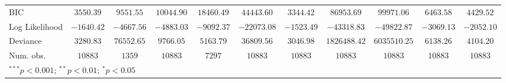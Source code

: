 \begin{tabular}{l c c c c c c c c c c}
BIC              & $3550.39$     & $9551.55$     & $10044.90$    & $18460.49$    & $44443.60$    & $3344.42$      & $86953.69$    & $99971.06$     & $6463.58$      & $4429.52$     \\
Log Likelihood   & $-1640.42$    & $-4667.56$    & $-4883.03$    & $-9092.37$    & $-22073.08$   & $-1523.49$     & $-43318.83$   & $-49822.87$    & $-3069.13$     & $-2052.10$    \\
Deviance         & $3280.83$     & $76552.65$    & $9766.05$     & $5163.79$     & $36809.56$    & $3046.98$      & $1826488.42$  & $6035510.25$   & $6138.26$      & $4104.20$     \\
Num. obs.        & $10883$       & $1359$        & $10883$       & $7297$        & $10883$       & $10883$        & $10883$       & $10883$        & $10883$        & $10883$       \\
\bottomrule
\multicolumn{11}{l}{\scriptsize{$^{***}p<0.001$; $^{**}p<0.01$; $^{*}p<0.05$}}
\end{tabular}
